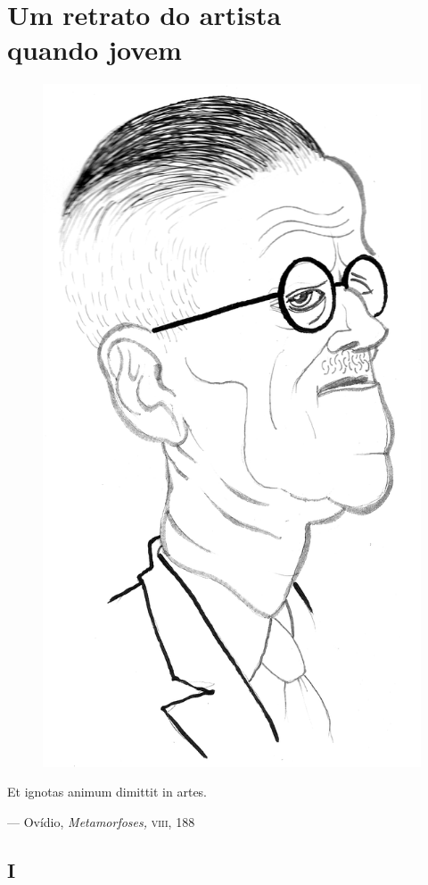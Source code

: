 ﻿
\makeatletter
\renewcommand\@endpart{\vfil\clearpage}
\makeatother

\part[Um retrato do artista quando jovem]{Um retrato do artista\\ quando jovem}

\pagestyle{myheadings}

\begin{figure}[c]
\begin{center}
\includegraphics[width=.6\textwidth]{joyce5.jpg}
\end{center}
\end{figure}

\clearpage

\vspace*{.5\textheight}
\thispagestyle{empty}

\epigraph{Et ignotas animum dimittit in artes.\footnotemark}{ --- Ovídio, \textit{Metamorfoses,} \textsc{viii}, 188}

\chapter{I}

